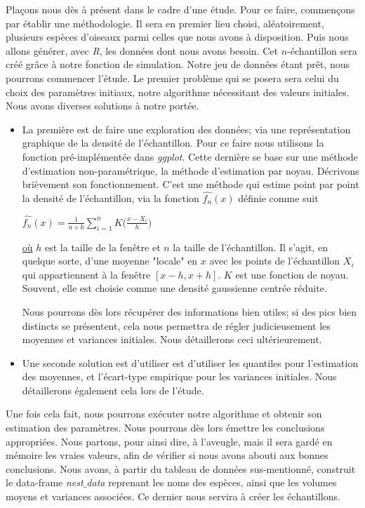\documentclass[frenchb]{report}
\newcommand{\1}{\mathbbm{1}}
\theoremstyle{definition}\newtheorem{defn}{Définition}
\theoremstyle{definition}\newtheorem{exm}{Exemple}
\theoremstyle{definition}\newtheorem{nota}{Notation}
\theoremstyle{definition}\newtheorem{rem}{Remarque}
\begin{document}
Plaçons nous dès à présent dans le cadre d'une étude. Pour ce faire, commençons par établir une méthodologie. 
Il sera en premier lieu choisi, aléatoirement, plusieurs espèces d'oiseaux parmi celles que nous avons à disposition. Puis nous allons générer, avec \textit{R}, les données dont nous avons besoin. Cet $n$-échantillon sera créé grâce à notre fonction de simulation. Notre jeu de données étant prêt, nous pourrons commencer l'étude. \newline
\newpage
Le premier problème qui se posera sera celui du choix des paramètres initiaux, notre algorithme nécessitant des valeurs initiales. Nous avons diverses solutions à notre portée.
\begin{itemize}[label=\adfflowerleft]
\item La première est de faire une exploration des données; via une représentation graphique de la densité de l'échantillon. Pour ce faire nous utilisons la fonction pré-implémentée dans \textit{ggplot}. Cette dernière se base sur une méthode d'estimation non-paramétrique, la méthode d'estimation par noyau. Décrivons brièvement son fonctionnement. C'est une méthode qui estime point par point la densité de l'échantillon, via la fonction $\widehat{f_n}(x)$ définie comme suit

\begin{center}
$
\widehat{f_n}(x) = \displaystyle \frac{1}{n\times h} \sum_{i=1}^n K\Big(\frac{x - X_i}{h}\Big)
$
\end{center}
\underline{où} $h$ est la taille de la fenêtre et $n$ la taille de l'échantillon. Il s'agit, en quelque sorte, d'une moyenne "locale" en $x$ avec les points de l'échantillon $X_i$ qui appartiennent à la fenêtre $[x-h, x+h]$. $K$ est une fonction de noyau. Souvent, elle est choisie comme une densité gaussienne centrée réduite.

Nous pourrons dès lors récupérer des informations bien utiles; si des pics bien distincts se présentent, cela nous permettra de régler judicieusement les moyennes et variances initiales. Nous détaillerons ceci ultérieurement. \newline
\item Une seconde solution est d'utiliser est d'utiliser les quantiles pour l'estimation des moyennes, et l'écart-type empirique pour les variances initiales. Nous détaillerons également cela lors de l'étude.
\end{itemize}

Une fois cela fait, nous pourrons exécuter notre algorithme et obtenir son estimation des paramètres. Nous pourrons dès lors émettre les conclusions appropriées.\newline
Nous partons, pour ainsi dire, à l'aveugle, mais il sera gardé en mémoire les vraies valeurs, afin de vérifier si nous avons abouti aux bonnes conclusions. \newline
Nous avons, à partir du tableau de données sus-mentionné, construit le data-frame \textit{nest$\_$data} reprenant les noms des espèces, ainsi que les volumes moyens et variances associées. Ce dernier nous servira à créer les échantillons.
\newpage
\end{document}
